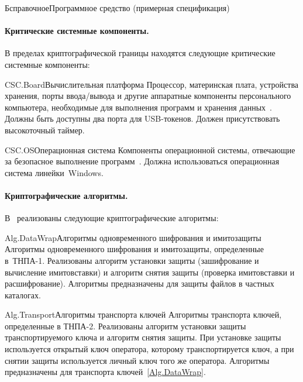 \begin{appendix}{Б}{справочное}{Программное средство \CryptoDisk 
(примерная спецификация)}
\paragraph*{Критические системные компоненты.}
В пределах криптографической границы находятся следующие критические 
системные компоненты:

\begin{definition}{CSC.Board}{Вычислительная платформа}
Процессор, материнская плата, устройства хранения, 
порты ввода/вывода и другие аппаратные 
компоненты персонального компьютера, 
необходимые для выполнения программ и хранения данных~\CryptoDisk.
%
Должны быть доступны два порта для USB-токенов.
%
Должен присутствовать высокоточный таймер.
\end{definition}

\begin{definition}{CSC.OS}{Операционная система}
Компоненты операционной системы, 
отвечающие за безопасное выполнение программ~\CryptoDisk. 
Должна использоваться операционная система линейки~Windows.
\end{definition}

\label{EXAMPLE.Crypto}

\paragraph*{Криптографические алгоритмы.} 
В~\CryptoDisk
реализованы следующие криптографические алгоритмы:

\begin{definition}{Alg.DataWrap}{Алгоритмы одновременного шифрования и имитозащиты}
Алгоритмы одновременного шифрования и имитозащиты, определенные в~ТНПА-1. 
Реализованы алгоритм установки защиты 
(зашифрование и вычисление имитовставки) 
и алгоритм снятия защиты
(проверка имитовставки и расшифрование).
Алгоритмы предназначены для защиты файлов в частных каталогах.
\end{definition}

\begin{definition}{Alg.Transport}{Алгоритмы транспорта ключей} 
Алгоритмы транспорта ключей, определенные в ТНПА-2. 
Реализованы алгоритм установки защиты транспортируемого
ключа и алгоритм снятия защиты. 
При установке защиты используется открытый ключ оператора, 
которому транспортируется ключ,
а при снятии защиты используется личный ключ того же оператора.
Алгоритмы предназначены для транспорта ключей~\ref{Alg.DataWrap}.
\end{definition}


\end{appendix}

